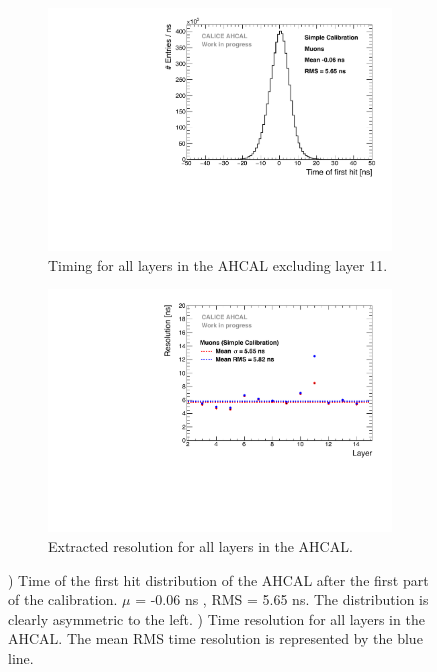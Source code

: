 \begin{figure}[htbp!]
	\begin{subfigure}[t]{0.45\textwidth}
		\centering
		\includegraphics[width=1\textwidth]{chap5/fig_AHCAL_timing/Muons/Timing_AHCAL_noCorrections.pdf}
		\caption{Timing for all layers in the AHCAL excluding layer 11.}\label{fig:timing_nocorrection}
	\end{subfigure}
	\hfill
	\begin{subfigure}[t]{0.45\textwidth}
		\centering
		\includegraphics[width=1\textwidth]{chap5/fig_AHCAL_timing/Muons/ResolutionPerModule_noCorrections.pdf}
		\caption{Extracted resolution for all layers in the AHCAL.}\label{fig:reso_nocorrection}
	\end{subfigure}
	\caption{) Time of the first hit distribution of the AHCAL after the first part of the calibration. $\mu$ = -0.06 ns , RMS = 5.65 ns. The distribution is clearly asymmetric to the left. ) Time resolution for all layers in the AHCAL. The mean RMS time resolution is represented by the blue line.}
\end{figure}

